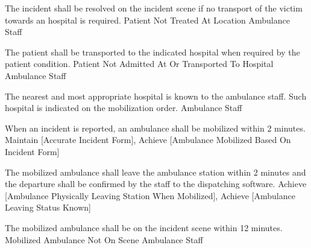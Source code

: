   \startkaosspec
  	 {The incident shall be resolved on the incident scene if no transport of the victim towards an hospital is required.}
  	 {Patient Not Treated At Location}
  	 {Ambulance Staff}
  \stopkaosspec

  \startkaosspec
  	 {The patient shall be transported to the indicated hospital when required by the patient condition.}
  	 {Patient Not Admitted At Or Transported To Hospital}
  	 {Ambulance Staff}
  \stopkaosspec

  \startkaosspec
  	 {The nearest and most appropriate hospital is known to the ambulance staff. Such hospital is indicated on the mobilization order.}
  	 {Ambulance Staff}
  \stopkaosspec
  
  
    {}

  \startkaosspec
  	 {When an incident is reported, an ambulance shall be mobilized within 2 minutes.}
  	 {Maintain [Accurate Incident Form], Achieve [Ambulance Mobilized Based On Incident Form]}
  \stopkaosspec

  \startkaosspec
  	 {The mobilized ambulance shall leave the ambulance station within 2 minutes and the departure shall be confirmed by the staff to the dispatching software.}
  	 {Achieve [Ambulance Physically Leaving Station When Mobilized], Achieve [Ambulance Leaving Status Known]}
  \stopkaosspec

  \startkaosspec
  	 {The mobilized ambulance shall be on the incident scene within 12 minutes.}
  	 {Mobilized Ambulance Not On Scene}
  	 {Ambulance Staff}
  \stopkaosspec
  
